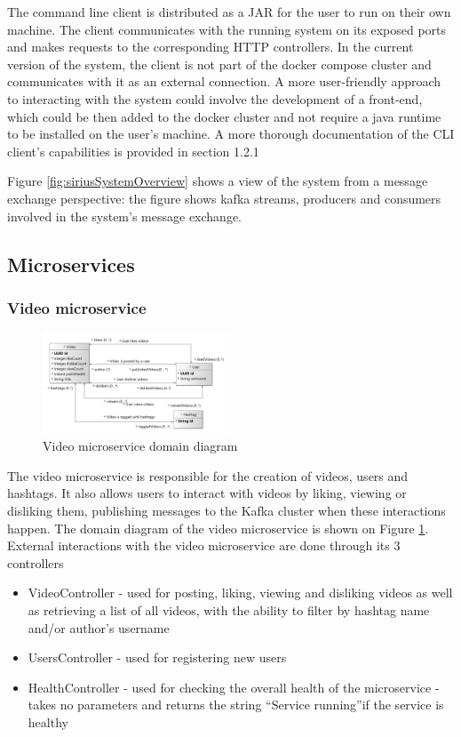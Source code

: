 \documentclass[parskip=full]{article}
\begin{document}
    The command line client is distributed as a JAR for the user to run on their own machine.
    The client communicates with the running system on its exposed ports and makes requests to the corresponding HTTP controllers.
    In the current version of the system, the client is not part of the docker compose cluster and communicates with it as an external connection.
    A more user-friendly approach to interacting with the system could involve the development of a front-end, which could be then added to the docker cluster and not require a java runtime to be installed on the user's machine.
    A more thorough documentation of the CLI client's capabilities is provided in section 1.2.1

    Figure \ref{fig:siriusSystemOverview} shows a view of the system from a message exchange perspective: the figure shows kafka streams, producers and consumers involved in the system's message exchange.

    \pagebreak
    \subsection{Microservices}
    \subsubsection{Video microservice}

    \begin{figure}
        \includegraphics[width=0.5\textwidth]{vm-domain-diagram}
        \caption{Video microservice domain diagram}
        \label{fig:vmDomain}
    \end{figure}
    The video microservice is responsible for the creation of videos, users and hashtags.
    It also allows users to interact with videos by liking, viewing or disliking them, publishing messages to the Kafka cluster when these interactions happen.
    The domain diagram of the video microservice is shown on Figure \ref{fig:vmDomain}.
    External interactions with the video microservice are done through its 3 controllers

    \begin{itemize}
        \item VideoController - used for posting, liking, viewing and disliking videos as well as retrieving a list of all videos, with the ability to filter by hashtag name and/or author's username
        \item UsersController - used for registering new users
        \item HealthController - used for checking the overall health of the microservice - takes no parameters and returns the string ``Service running''if the service is healthy
    \end{itemize}
\end{document}
